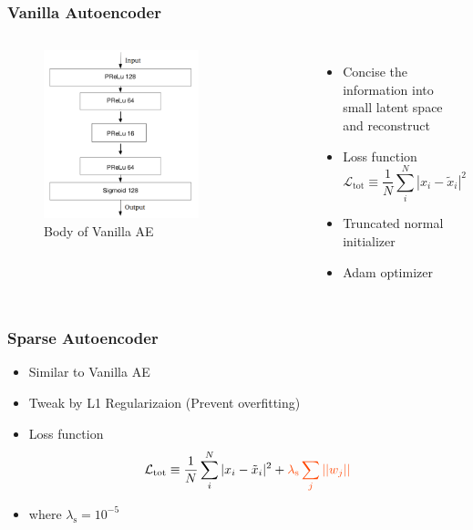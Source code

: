 \documentclass{beamer}
\begin{document}
\begin{frame}
\frametitle{Vanilla Autoencoder}
\begin{columns}
    \begin{figure}
        \includegraphics[height=0.6\textheight, width=0.7\textwidth]{images/vanilla_ae}
        \caption{Body of Vanilla AE}
    \end{figure}

    \begin{itemize}
    \item Concise the information into small latent space and reconstruct
    \item Loss function
    \begin{equation}
        \mathcal{L}_{\text{tot}} \equiv \frac{1}{N}\sum_i^N |x_i-\tilde{x}_i|^2
    \end{equation}
    \item Truncated normal initializer
    \item Adam optimizer
    \end{itemize}
\end{columns}
\end{frame}
\begin{frame}
\frametitle{Sparse Autoencoder}
\begin{itemize}
    \item Similar to Vanilla AE
    \item Tweak by \textcolor[RGB]{255,69,0}{L1 Regularizaion (Prevent overfitting)}
    \item Loss function
    \begin{equation}
        \mathcal{L}_{\text{tot}} \equiv \frac{1}{N}\sum_i^N |x_i-\tilde{x}_i|^2 + \textcolor[RGB]{255,69,0}{\lambda_{\text{s}}\sum_j||w_j||}
    \end{equation}
    \item where $\lambda_{\text{s}} = 10^{-5}$
\end{itemize}

\end{frame}
\end{document}
